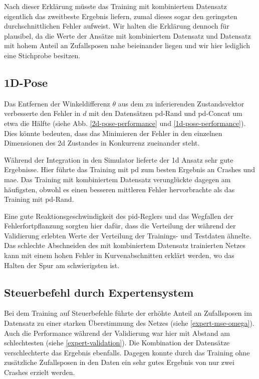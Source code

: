 Nach dieser Erklärung müsste das Training mit kombiniertem Datensatz eigentlich das zweitbeste Ergebnis liefern, zumal dieses sogar den geringsten durchschnittlichen Fehler aufweist. Wir halten die Erklärung dennoch für plausibel, da die Werte der Ansätze mit kombiniertem Datensatz und Datensatz mit hohem Anteil an Zufallsposen nahe beieinander liegen und wir hier lediglich eine Stichprobe besitzen.

\subsection{1D-Pose}

Das Entfernen der Winkeldifferenz $\theta$ aus dem zu inferierenden Zustandsvektor verbesserte den Fehler in $d$ mit den Datensätzen \glqq\acs{pd}-Rand\grqq{} und \glqq\acs{pd}-Concat\grqq{} um etwa die Hälfte (siehe Abb. \ref{2d-pose-performance} und \ref{1d-pose-performance}). Dies könnte bedeuten, dass das Minimieren der Fehler in den einzelnen Dimensionen des \acs{2d} Zustandes in Konkurrenz zueinander steht.

Während der Integration in den Simulator lieferte der \acs{1d} Ansatz sehr gute Ergebnisse. Hier führte das Training mit \glqq\acs{pd}\grqq{} zum besten Ergebnis an Crashes und \acs{mae}. Das Training mit kombiniertem Datensatz verunglückte dagegen am häufigsten, obwohl es einen besseren mittleren Fehler hervorbrachte als das Training mit \glqq\acs{pd}-Rand\grqq.

Eine gute Reaktionsgeschwindigkeit des \acs{pid}-Reglers und das Wegfallen der Fehlerfortpflanzung sorgten hier dafür, dass die Verteilung der während der Validierung erlebten Werte der Verteilung der Trainings- und Testdaten ähnelte. Das schlechte Abschneiden des mit kombiniertem Datensatz trainierten Netzes kann mit einem hohen Fehler in Kurvenabschnitten erklärt werden, wo das Halten der Spur am schwierigsten ist.

\subsection{Steuerbefehl durch Expertensystem}

Bei dem Training auf Steuerbefehle führte der erhöhte Anteil an Zufallsposen im Datensatz zu einer starken Überstimmung des Netzes (siehe \ref{expert-mse-omega}). Auch die Performance während der Validierung war hier mit Abstand am schlechtesten (siehe \ref{expert-validation}).  Die Kombination der Datensätze verschlechterte das Ergebnis ebenfalls. Dagegen konnte durch das Training ohne zusätzliche Zufallsposen in den Daten ein sehr gutes Ergebnis von nur zwei Crashes erzielt werden.


